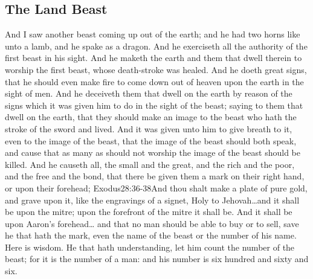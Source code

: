\subsection*{The Land Beast}
And I saw another beast coming up out of the earth; and he had two horns%
 like unto a lamb, and he spake as a dragon. 
And he exerciseth all the authority of the first beast in his sight. And he maketh the earth and them that dwell therein to worship the first beast, whose death-stroke was healed. 
And he doeth great signs, that he should even make fire to come down out of heaven upon the earth in the sight of men.%
And he deceiveth them that dwell on the earth by reason of the signs which it was given him to do in the sight of the beast; saying to them that dwell on the earth, that they should make an image to the beast who hath the stroke of the sword and lived. 
And it was given unto him to give breath to it, even to the image of the beast, that the image of the beast should both speak, and cause that as many as should not worship the image of the beast should be killed.%
And he causeth all, the small and the great, and the rich and the poor, and the free and the bond, that there be given them a mark on their right hand, or upon their forehead;%
				  {Exodus}{28:36-38}{And thou shalt make a plate of pure gold, and grave upon it, like the engravings of a signet, Holy to Jehovah\ldots and it shall be upon the mitre; upon the forefront of the mitre it shall be. And it shall be upon Aaron’s forehead\ldots}
and that no man should be able to buy or to sell, save he that hath the mark, even the name of the beast or the number of his name. 
Here is wisdom. He that hath understanding, let him count the number of the beast; for it is the number of a man: and his number is six hundred and sixty and six.
